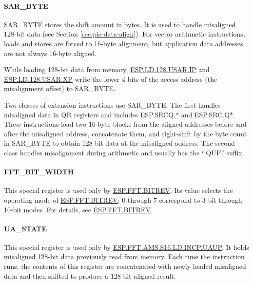 \documentclass[main\_\_EN.tex]{subfiles}
\begin{document}
\paragraph{SAR\_BYTE}

SAR\_BYTE stores the shift amount in bytes. It is used to handle misaligned 128-bit data (see Section \ref{sec:pie-data-align}). For vector arithmetic instructions, loads and stores are forced to 16-byte alignment, but application data addresses are not always 16-byte aligned.

While loading 128-bit data from memory, \hyperref[instruction:ESPLD128USARIP]{ESP.LD.128.USAR.IP} and \hyperref[instruction:ESPLD128USARXP]{ESP.LD.128.USAR.XP} write the lower 4 bits of the access address (the misalignment offset) to SAR\_BYTE.

Two classes of \chipname{} extension instructions use SAR\_BYTE. The first handles misaligned data in QR registers and includes ESP.SRCQ.* and ESP.SRC.Q*. These instructions load two 16-byte blocks from the aligned addresses before and after the misaligned address, concatenate them, and right-shift by the byte count in SAR\_BYTE to obtain 128-bit data at the misaligned address. The second class handles misalignment during arithmetic and usually has the ``.QUP'' suffix.





\paragraph{FFT\_BIT\_WIDTH}

This special register is used only by \hyperref[instruction:ESPFFTBITREV]{ESP.FFT.BITREV}. Its value selects the operating mode of \hyperref[instruction:ESPFFTBITREV]{ESP.FFT.BITREV}: 0 through 7 correspond to 3-bit through 10-bit modes. For details, see \hyperref[instruction:ESPFFTBITREV]{ESP.FFT.BITREV}.

\paragraph{UA\_STATE}

This special register is used only by \hyperref[instruction:ESPFFTAMSS16LDINCPUAUP]{ESP.FFT.AMS.S16.LD.INCP.UAUP}. It holds misaligned 128-bit data previously read from memory. Each time the instruction runs, the contents of this register are concatenated with newly loaded misaligned data and then shifted to produce a 128-bit aligned result.
\end{document}
